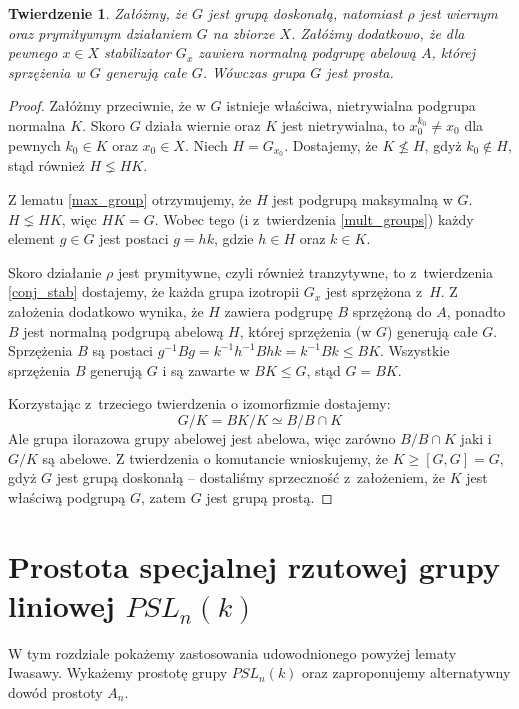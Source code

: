 \documentclass[licencjacka]{pracamgr}
\newtheorem{thh}{Twierdzenie}[section]
\begin{document}
\begin{thh}
    Załóżmy, że $G$ jest grupą doskonałą, natomiast $\rho$ jest wiernym oraz prymitywnym działaniem $G$ na zbiorze $X$.
    Załóżmy dodatkowo, że dla pewnego $x \in X$ stabilizator $G_x$ zawiera normalną podgrupę abelową $A$,
    której sprzężenia w $G$ generują całe $G$.
    Wówczas grupa $G$ jest prosta.
\end{thh}
\begin{proof}
    Załóżmy przeciwnie, że w $G$ istnieje właściwa, nietrywialna podgrupa normalna $K$.
    Skoro $G$ działa wiernie oraz $K$ jest nietrywialna, to $x_0^{k_0} \ne x_0$ dla pewnych $k_0 \in K$ oraz $x_0 \in X$.
    Niech $H = G_{x_0}$.
    Dostajemy, że $K \nleq H$, gdyż $k_0 \not \in H$, stąd również $H \lneq H K$.

    Z lematu \ref{max_group} otrzymujemy, że $H$ jest podgrupą maksymalną w $G$.
    $H \lneq H K$, więc $H K = G$.
    Wobec tego (i z~twierdzenia \ref{mult_groups}) każdy element $g \in G$ jest postaci $g = h k$, gdzie $h \in H$ oraz $k \in K$.

    Skoro działanie $\rho$ jest prymitywne, czyli również tranzytywne, to z~twierdzenia \ref{conj_stab}
    dostajemy, że każda grupa izotropii $G_x$ jest sprzężona z~$H$.
    Z założenia dodatkowo wynika, że $H$ zawiera podgrupę $B$ sprzężoną do $A$,
    ponadto $B$ jest normalną podgrupą abelową $H$, której sprzężenia (w $G$) generują całe $G$.
    Sprzężenia $B$ są postaci $g^{-1} B g = k^{-1} h^{-1} B h k = k^{-1} B k \le B K$.
    Wszystkie sprzężenia $B$ generują $G$ i są zawarte w $B K \le G$, stąd $G = B K$.

    Korzystając z~trzeciego twierdzenia o izomorfizmie dostajemy:
    $$ G/K = BK/K \simeq B/B\cap K$$
    Ale grupa ilorazowa grupy abelowej jest abelowa, więc zarówno $B/B\cap K$ jaki i $G/K$ są abelowe.
    Z twierdzenia o komutancie wnioskujemy, że $K \ge [G, G] = G$, gdyż $G$ jest grupą doskonałą --
    dostaliśmy sprzeczność z~założeniem, że $K$ jest właściwą podgrupą $G$, zatem $G$ jest grupą prostą.
\end{proof}



\chapter{Prostota specjalnej rzutowej grupy liniowej $PSL_n(k)$}

W tym rozdziale pokażemy zastosowania udowodnionego powyżej lematy Iwasawy.
Wykażemy prostotę grupy $PSL_n(k)$ oraz zaproponujemy alternatywny dowód prostoty $A_n$.
\end{document}
